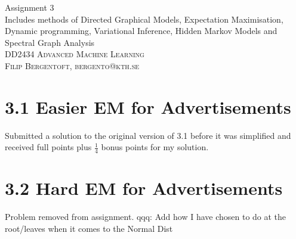 \documentclass[11pt,oneside,a4paper]{article}
\date{}
\theoremstyle{definition}
\theoremstyle{remark}
\begin{document}
\renewcommand{\bibname}{References}
\hypersetup{citecolor=black}
\begin{titlepage}\centering
\vspace*{\fill}
\Huge Assignment 3\\
\vspace*{10mm}
\large Includes methods of Directed Graphical Models, Expectation Maximisation, Dynamic programming, Variational Inference, Hidden Markov Models and Spectral Graph Analysis\\
\vspace*{\fill}
\large \textsc{DD2434 Advanced Machine Learning} \\
\textsc{Filip Bergentoft, bergento@kth.se} \\
\end{titlepage}

\newpage
\section*{3.1 Easier EM for Advertisements}
Submitted a solution to the original version of 3.1 before it was simplified and received full points plus $\frac{1}{4}$ bonus points for my solution.

\section*{3.2 Hard EM for Advertisements}
Problem removed from assignment.
qqq: Add how I have chosen to do at the root/leaves when it comes to the Normal Dist

\newpage

\newpage

\end{document}
